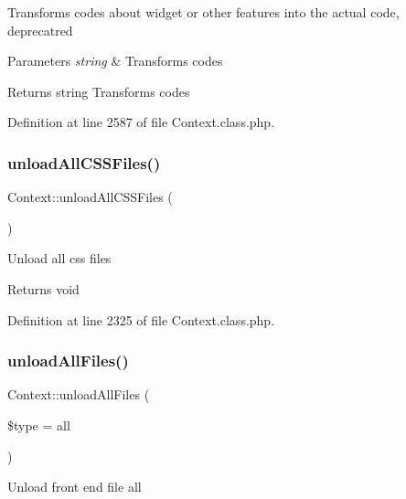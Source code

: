 Transforms codes about widget or other features into the actual code, deprecatred


\begin{DoxyParams}{Parameters}
{\em string} & Transforms codes \\
\hline
\end{DoxyParams}
\begin{DoxyReturn}{Returns}
string Transforms codes 
\end{DoxyReturn}


Definition at line 2587 of file Context.\+class.\+php.

\hypertarget{classContext_a9eb05677aeb2e95029a10919ffc6053f}{}\label{classContext_a9eb05677aeb2e95029a10919ffc6053f} 
\subsubsection{\texorpdfstring{unload\+All\+C\+S\+S\+Files()}{unloadAllCSSFiles()}}
{\footnotesize\ttfamily Context\+::unload\+All\+C\+S\+S\+Files (\begin{DoxyParamCaption}{ }\end{DoxyParamCaption})}

Unload all css files

\begin{DoxyReturn}{Returns}
void 
\end{DoxyReturn}


Definition at line 2325 of file Context.\+class.\+php.

\hypertarget{classContext_a9b73c566c20a2ea32cab8180957c4b6d}{}\label{classContext_a9b73c566c20a2ea32cab8180957c4b6d} 
\subsubsection{\texorpdfstring{unload\+All\+Files()}{unloadAllFiles()}}
{\footnotesize\ttfamily Context\+::unload\+All\+Files (\begin{DoxyParamCaption}\item[{}]{\$type = {\ttfamily \textquotesingle{}all\textquotesingle{}} }\end{DoxyParamCaption})}

Unload front end file all


